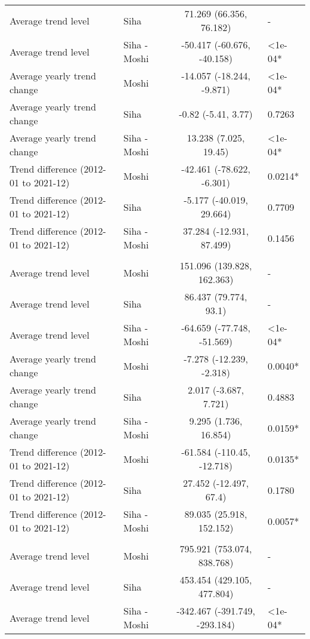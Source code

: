 \begin{longtable}{l|lcl}
Average trend level & Siha & 71.269 (66.356, 76.182) & - \\ 
Average trend level & Siha - Moshi & -50.417 (-60.676, -40.158) & <1e-04* \\ 
Average yearly trend change & Moshi & -14.057 (-18.244, -9.871) & <1e-04* \\ 
Average yearly trend change & Siha & -0.82 (-5.41, 3.77) & 0.7263 \\ 
Average yearly trend change & Siha - Moshi & 13.238 (7.025, 19.45) & <1e-04* \\ 
Trend difference (2012-01 to 2021-12) & Moshi & -42.461 (-78.622, -6.301) & 0.0214* \\ 
Trend difference (2012-01 to 2021-12) & Siha & -5.177 (-40.019, 29.664) & 0.7709 \\ 
Trend difference (2012-01 to 2021-12) & Siha - Moshi & 37.284 (-12.931, 87.499) & 0.1456 \\ 
\midrule\addlinespace[2.5pt]
\multicolumn{4}{l}{Fractures} \\[2.5pt] 
\midrule\addlinespace[2.5pt]
Average trend level & Moshi & 151.096 (139.828, 162.363) & - \\ 
Average trend level & Siha & 86.437 (79.774, 93.1) & - \\ 
Average trend level & Siha - Moshi & -64.659 (-77.748, -51.569) & <1e-04* \\ 
Average yearly trend change & Moshi & -7.278 (-12.239, -2.318) & 0.0040* \\ 
Average yearly trend change & Siha & 2.017 (-3.687, 7.721) & 0.4883 \\ 
Average yearly trend change & Siha - Moshi & 9.295 (1.736, 16.854) & 0.0159* \\ 
Trend difference (2012-01 to 2021-12) & Moshi & -61.584 (-110.45, -12.718) & 0.0135* \\ 
Trend difference (2012-01 to 2021-12) & Siha & 27.452 (-12.497, 67.4) & 0.1780 \\ 
Trend difference (2012-01 to 2021-12) & Siha - Moshi & 89.035 (25.918, 152.152) & 0.0057* \\ 
\midrule\addlinespace[2.5pt]
\multicolumn{4}{l}{Hypertension} \\[2.5pt] 
\midrule\addlinespace[2.5pt]
Average trend level & Moshi & 795.921 (753.074, 838.768) & - \\ 
Average trend level & Siha & 453.454 (429.105, 477.804) & - \\ 
Average trend level & Siha - Moshi & -342.467 (-391.749, -293.184) & <1e-04* \\ 

\end{longtable}
